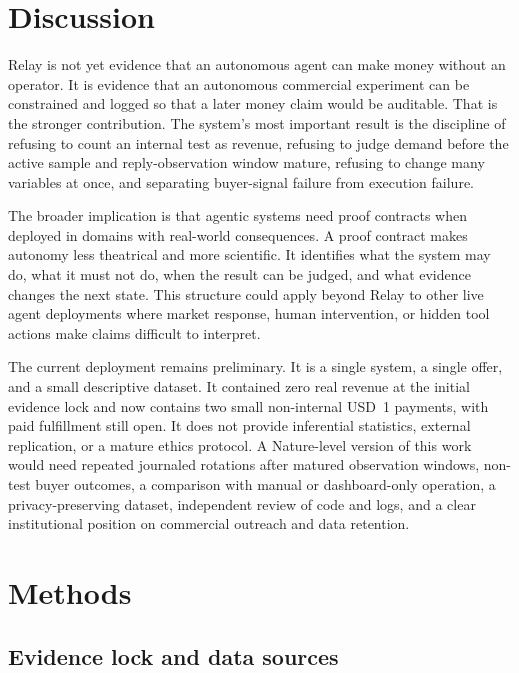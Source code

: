 \documentclass[12pt,letterpaper]{article}
\begin{document}
\section{Discussion}

Relay is not yet evidence that an autonomous agent can make money without an operator. It is evidence that an autonomous commercial experiment can be constrained and logged so that a later money claim would be auditable. That is the stronger contribution. The system's most important result is the discipline of refusing to count an internal test as revenue, refusing to judge demand before the active sample and reply-observation window mature, refusing to change many variables at once, and separating buyer-signal failure from execution failure.

The broader implication is that agentic systems need proof contracts when deployed in domains with real-world consequences. A proof contract makes autonomy less theatrical and more scientific. It identifies what the system may do, what it must not do, when the result can be judged, and what evidence changes the next state. This structure could apply beyond Relay to other live agent deployments where market response, human intervention, or hidden tool actions make claims difficult to interpret.

The current deployment remains preliminary. It is a single system, a single offer, and a small descriptive dataset. It contained zero real revenue at the initial evidence lock and now contains two small non-internal USD~1 payments, with paid fulfillment still open. It does not provide inferential statistics, external replication, or a mature ethics protocol. A Nature-level version of this work would need repeated journaled rotations after matured observation windows, non-test buyer outcomes, a comparison with manual or dashboard-only operation, a privacy-preserving dataset, independent review of code and logs, and a clear institutional position on commercial outreach and data retention.

\section{Methods}

\subsection{Evidence lock and data sources}
\end{document}
